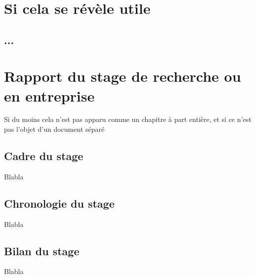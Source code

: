 
\appendix
\chapter{Si cela se révèle utile}

\section{...}
\chapter{Rapport du stage de recherche ou en entreprise}
Si du moins cela n'est pas apparu comme un chapitre à part entière, et si ce n'est pas l'objet d'un document séparé
\section{Cadre du stage}
Blabla
\section{Chronologie du stage}
Blabla
\section{Bilan du stage}
Blabla
